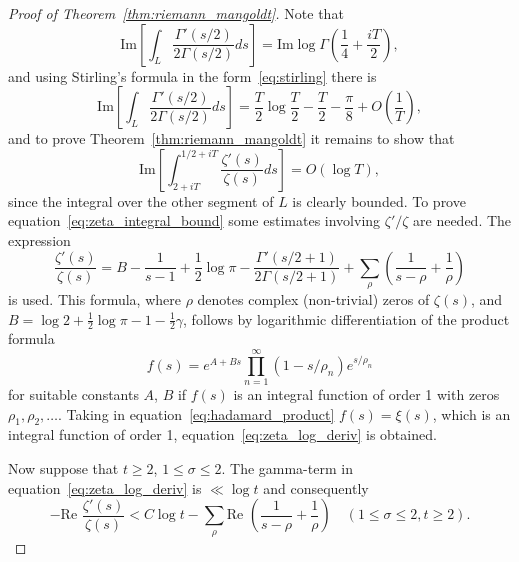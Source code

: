 \documentclass[11pt]{article}
\begin{document}
\begin{proof}[Proof of Theorem~\ref{thm:riemann_mangoldt}]
Note that
\begin{equation}\label{eq:gamma_integral_eval}
\text{Im} \left[ \int_L \frac{\Gamma'(s/2)}{2\Gamma(s/2)} ds \right] = \text{Im} \log \Gamma\left(\frac{1}{4} + \frac{iT}{2}\right),
\end{equation}
and using Stirling's formula in the form~\eqref{eq:stirling} there is
\begin{equation}\label{eq:stirling_eval}
\text{Im} \left[ \int_L \frac{\Gamma'(s/2)}{2\Gamma(s/2)} ds \right] = \frac{T}{2} \log \frac{T}{2} - \frac{T}{2} - \frac{\pi}{8} + O\left(\frac{1}{T}\right),
\end{equation}
and to prove Theorem~\ref{thm:riemann_mangoldt} it remains to show that
\begin{equation}\label{eq:zeta_integral_bound}
\text{Im} \left[ \int_{2+iT}^{1/2+iT} \frac{\zeta'(s)}{\zeta(s)} ds \right] = O(\log T),
\end{equation}
since the integral over the other segment of $L$ is clearly bounded. To prove equation~\eqref{eq:zeta_integral_bound} some estimates involving $\zeta'/\zeta$ are needed. The expression
\begin{equation}\label{eq:zeta_log_deriv}
\frac{\zeta'(s)}{\zeta(s)} = B - \frac{1}{s-1} + \frac{1}{2} \log \pi - \frac{\Gamma'(s/2+1)}{2\Gamma(s/2+1)} + \sum_{\rho} \left( \frac{1}{s-\rho} + \frac{1}{\rho} \right)
\end{equation}
is used. This formula, where $\rho$ denotes complex (non-trivial) zeros of $\zeta(s)$, and $B = \log 2 + \frac{1}{2} \log \pi - 1 - \frac{1}{2}\gamma$, follows by logarithmic differentiation of the product formula
\begin{equation}\label{eq:hadamard_product}
f(s) = e^{A+Bs} \prod_{n=1}^{\infty} (1 - s/\rho_n) e^{s/\rho_n}
\end{equation}
for suitable constants $A$, $B$ if $f(s)$ is an integral function of order 1 with zeros $\rho_1, \rho_2, \ldots$. Taking in equation~\eqref{eq:hadamard_product} $f(s) = \xi(s)$, which is an integral function of order 1, equation~\eqref{eq:zeta_log_deriv} is obtained.

Now suppose that $t \geq 2$, $1 \leq \sigma \leq 2$. The gamma-term in equation~\eqref{eq:zeta_log_deriv} is $\ll \log t$ and consequently
\begin{equation}\label{eq:zeta_real_part}
-\text{Re } \frac{\zeta'(s)}{\zeta(s)} < C \log t - \sum_{\rho} \text{Re } \left( \frac{1}{s-\rho} + \frac{1}{\rho} \right) \quad (1 \leq \sigma \leq 2, t \geq 2).
\end{equation}


\end{proof}
\end{document}
